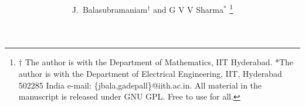 \documentclass[journal,12pt,twocolumn]{IEEEtran}
\begin{document}

\def\putbox#1#2#3{\makebox[0in][l]{\makebox[#1][l]{}\raisebox{\baselineskip}[0in][0in]{\raisebox{#2}[0in][0in]{#3}}}}
     \def\rightbox#1{\makebox[0in][r]{#1}}
     \def\centbox#1{\makebox[0in]{#1}}
     \def\topbox#1{\raisebox{-\baselineskip}[0in][0in]{#1}}
     \def\midbox#1{\raisebox{-0.5\baselineskip}[0in][0in]{#1}}

\vspace{3cm}

\title{ 
}


%
%
%

\author{J.~Balasubramaniam$^{\dagger}$ and G V V Sharma$^{*}$ %
\thanks{$\dagger$ The author is with the Department of Mathematics, IIT Hyderabad.  *The author is with the Department
of Electrical Engineering, IIT, Hyderabad
502285 India e-mail: \{jbala,gadepall\}@iith.ac.in. All material in the manuscript is released under GNU GPL.  Free to use for all.}%
}
% 
%
\end{document}
